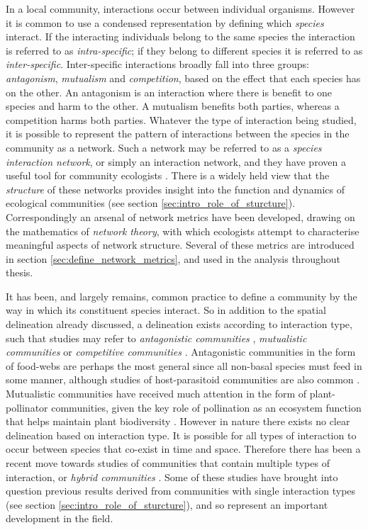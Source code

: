 In a local community, interactions occur between individual organisms. However it is common to use a condensed representation by defining which \emph{species} interact. If the interacting individuals belong to the same species the interaction is referred to as \emph{intra-specific}; if they belong to different species it is referred to as \emph{inter-specific}. Inter-specific interactions broadly fall into three groups: \emph{antagonism}, \emph{mutualism} and \emph{competition}, based on the effect that each species has on the other. An antagonism is an interaction where there is benefit to one species and harm to the other. A mutualism benefits both parties, whereas a competition harms both parties. Whatever the type of interaction being studied, it is possible to represent the pattern of interactions between the species in the community as a network. Such a network may be referred to as a \emph{species interaction network}, or simply an interaction network, and they have proven a useful tool for community ecologists \cite{bascompte2007networks}. There is a widely held view that the \emph{structure} of these networks provides insight into the function and dynamics of ecological communities (see section \ref{sec:intro_role_of_sturcture}). Correspondingly an arsenal of network metrics have been developed, drawing on the mathematics of \emph{network theory}, with which ecologists attempt to characterise meaningful aspects of network structure. Several of these metrics are introduced in section \ref{sec:define_network_metrics}, and used in the analysis throughout thesis.

It has been, and largely remains, common practice to define a community by the way in which its constituent species interact. So in addition to the spatial delineation already discussed, a delineation exists according to interaction type, such that studies may refer to \emph{antagonistic communities} \cite{albrecht2007interaction}, \emph{mutualistic communities} \cite{bascompte2007plant} or \emph{competitive communities} \cite{klausmeier2001habitat}. Antagonistic communities in the form of food-webs are perhaps the most general since all non-basal species must feed in some manner, although studies of host-parasitoid communities are also common \cite{laliberte2010deforestation}. Mutualistic communities have received much attention in the form of plant-pollinator communities, given the key role of pollination as an ecosystem function that helps maintain plant biodiversity \cite{vanbergen2013threats}. However in nature there exists no clear delineation based on interaction type. It is possible for all types of interaction to occur between species that co-exist in time and space. Therefore there has been a recent move towards studies of communities that contain multiple types of interaction, or \emph{hybrid communities} \cite{sauve2014structure,kefi2012more,fontaine2011ecological,evans2013robustness,montoya2015functional,mougi2012diversity}. Some of these studies have brought into question previous results derived from communities with single interaction types (see section \ref{sec:intro_role_of_sturcture}), and so represent an important development in the field.

